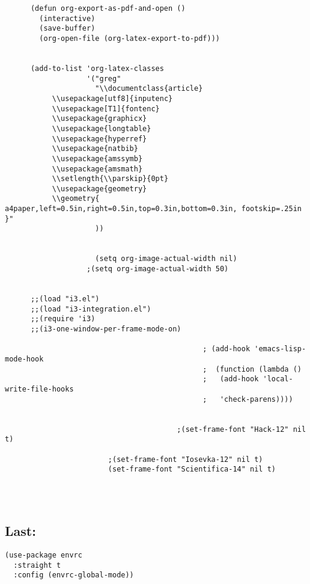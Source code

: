 \documentclass[11pt]{article}
\begin{document}
\begin{verbatim}
      (defun org-export-as-pdf-and-open ()
        (interactive)
        (save-buffer)
        (org-open-file (org-latex-export-to-pdf)))


      (add-to-list 'org-latex-classes
                   '("greg"
                     "\\documentclass{article}
           \\usepackage[utf8]{inputenc}
           \\usepackage[T1]{fontenc}
           \\usepackage{graphicx}
           \\usepackage{longtable}
           \\usepackage{hyperref}
           \\usepackage{natbib}
           \\usepackage{amssymb}
           \\usepackage{amsmath}
           \\setlength{\\parskip}{0pt}
           \\usepackage{geometry}
           \\geometry{ a4paper,left=0.5in,right=0.5in,top=0.3in,bottom=0.3in, footskip=.25in }"
                     ))   


                     (setq org-image-actual-width nil)
                   ;(setq org-image-actual-width 50)


      ;;(load "i3.el")
      ;;(load "i3-integration.el")
      ;;(require 'i3)
      ;;(i3-one-window-per-frame-mode-on)

                                              ; (add-hook 'emacs-lisp-mode-hook
                                              ;  (function (lambda ()
                                              ;   (add-hook 'local-write-file-hooks 
                                              ;   'check-parens))))  


                                        ;(set-frame-font "Hack-12" nil t)

                        ;(set-frame-font "Iosevka-12" nil t)
                        (set-frame-font "Scientifica-14" nil t) 




\end{verbatim}



\subsection{Last:}
\label{sec:org79426a0}
\begin{verbatim}
(use-package envrc
  :straight t
  :config (envrc-global-mode)) 
\end{verbatim}
\end{document}
